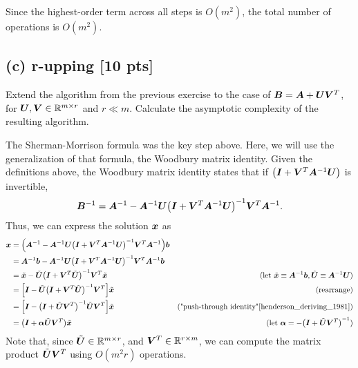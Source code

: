 \documentclass[twoside,10pt]{article}
\begin{document}
\quad Since the highest-order term across all steps is $O(m^2)$, the total number of operations is $O(m^2)$.

\subsection*{(c) r-upping [10 pts]}
Extend the algorithm from the previous exercise to the case of $\bm{B} = \bm{A} + \bm{U}\bm{V}^{T}$, for $\bm{U},\bm{V} \in \mathbb{R}^{m \times r}$ and $r \ll m$.
Calculate the asymptotic complexity of the resulting algorithm.

\quad The Sherman-Morrison formula was the key step above.
Here, we will use the generalization of that formula, the Woodbury matrix identity.
Given the definitions above, the Woodbury matrix identity states that if $\left(\mtx{I} + \mtx{V}^T\mtx{A}^{-1} \mtx{U}\right)$ is invertible,
$$\mtx{B}^{-1} = \mtx{A}^{-1} - \mtx{A}^{-1}\mtx{U} \left(\mtx{I} + \mtx{V}^T\mtx{A}^{-1}\mtx{U}\right)^{-1} \mtx{V}^T\mtx{A}^{-1}.$$
Thus, we can express the solution $\bm{x}$ as
\begin{align*}
  \vct{x} &= \left(\mtx{A}^{-1} - \mtx{A}^{-1}\mtx{U} \left(\mtx{I} + \mtx{V}^T\mtx{A}^{-1}\mtx{U}\right)^{-1} \mtx{V}^T\mtx{A}^{-1}\right)\vct{b}\\
  &= \mtx{A}^{-1}\vct{b} - \mtx{A}^{-1}\mtx{U} \left(\mtx{I} + \mtx{V}^T\mtx{A}^{-1}\mtx{U}\right)^{-1} \mtx{V}^T\mtx{A}^{-1}\vct{b}\\
  &= \tilde{\vct{x}} - \tilde{\mtx{U}} \left(\mtx{I} + \mtx{V}^T\tilde{\mtx{U}}\right)^{-1} \mtx{V}^T\tilde{\vct{x}} &\text{(let $\tilde{\vct{x}} \equiv \mtx{A}^{-1}\vct{b}, \tilde{\mtx{U}} \equiv \mtx{A}^{-1}\mtx{U}$)}\\
  &= \left[\mtx{I} - \tilde{\mtx{U}} \left(\mtx{I} + \mtx{V}^T\tilde{\mtx{U}}\right)^{-1} \mtx{V}^T\right]\tilde{\vct{x}} &\text{(rearrange)}\\
  &= \left[\mtx{I} - \left(\mtx{I} + \tilde{\mtx{U}}\mtx{V}^T\right)^{-1}\tilde{\mtx{U}}\mtx{V}^T\right]\tilde{\vct{x}} &\text{("push-through identity"\cite{henderson_deriving_1981})}\\
  &= \left(\mtx{I} + \mtx{\alpha}\tilde{\mtx{U}}\mtx{V}^T\right)\tilde{\vct{x}} &\text{(let $\mtx{\alpha} =- \left(\mtx{I} + \tilde{\mtx{U}}\mtx{V}^T\right)^{-1}$)}
\end{align*}
Note that, since $\tilde{\bm{U}} \in \mathbb{R}^{m \times r}$, and $\bm{V}^T \in \mathbb{R}^{r \times m}$, we can compute the matrix product $\tilde{\bm{U}}\bm{V}^T$ using $O(m^2r)$ operations.
\end{document}
